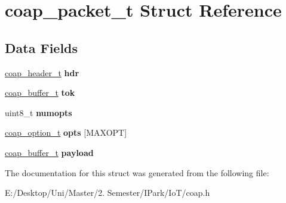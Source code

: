 \hypertarget{structcoap__packet__t}{}\section{coap\+\_\+packet\+\_\+t Struct Reference}
\label{structcoap__packet__t}
\subsection*{Data Fields}
\begin{DoxyCompactItemize}
\item 
\mbox{\label{structcoap__packet__t_ae61c461cc9b3e9a46b0693943533c5b4}} 
\hyperlink{structcoap__header__t}{coap\+\_\+header\+\_\+t} {\bfseries hdr}
\item 
\mbox{\label{structcoap__packet__t_a3940e2e718e59b83a5bd6f5a709b343c}} 
\hyperlink{structcoap__buffer__t}{coap\+\_\+buffer\+\_\+t} {\bfseries tok}
\item 
\mbox{\label{structcoap__packet__t_a0ed27fc4f580843365a89345fa193208}} 
uint8\+\_\+t {\bfseries numopts}
\item 
\mbox{\label{structcoap__packet__t_a17d0c20e195bb14f1b4cf30620464f00}} 
\hyperlink{structcoap__option__t}{coap\+\_\+option\+\_\+t} {\bfseries opts} \mbox{[}M\+A\+X\+O\+PT\mbox{]}
\item 
\mbox{\label{structcoap__packet__t_aed8584d0c7c9d2c9b64e06247cf1301d}} 
\hyperlink{structcoap__buffer__t}{coap\+\_\+buffer\+\_\+t} {\bfseries payload}
\end{DoxyCompactItemize}


The documentation for this struct was generated from the following file\+:\begin{DoxyCompactItemize}
\item 
E\+:/\+Desktop/\+Uni/\+Master/2. Semester/\+I\+Park/\+Io\+T/coap.\+h\end{DoxyCompactItemize}
